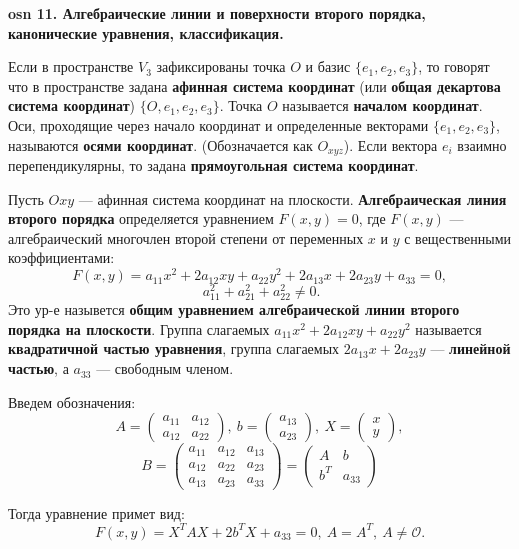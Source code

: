 \setcounter{section}{15}
\setcounter{subsection}{11}
\setcounter{equation}{0}
\textbf{\LARGE osn 11. Алгебраические линии и поверхности второго порядка, канонические уравнения,  классификация.}

Если в пространстве $V_3$ зафиксированы точка $O$ и базис $\{e_1, e_2, e_3\}$, то говорят что в пространстве задана \textbf{афинная система координат} (или \textbf{общая декартова система координат}) $\{O, e_1, e_2, e_3\}$. Точка $O$ называется \textbf{началом координат}. Оси, проходящие через начало координат и определенные векторами $\{e_1, e_2, e_3\}$, называются \textbf{осями координат}. (Обозначается как $O_{xyz}$). Если вектора $e_i$ взаимно перепендикулярны, то задана \textbf{прямоугольная система координат}.

\bigbreak

Пусть $Oxy$ --- афинная система координат на плоскости. \textbf{Алгебраическая линия второго порядка} определяется уравнением $F(x, y) = 0$, где $F(x, y)$ --- алгебраический многочлен второй степени от переменных $x$ и $y$ с вещественными коэффициентами:
$$F(x,y)=a_{11}x^2 +2a_{12}xy+a_{22}y^2 +2a_{13}x+2a_{23}y+a_{33} =0,$$
$$~a_{11}^2 + a_{21}^2 + a_{22}^2\neq 0.$$
Это ур-е назывется \textbf{общим уравнением алгебраической линии второго порядка на плоскости}. Группа слагаемых $a_{11}x^2 + 2a_{12}xy + a_{22}y^2$ называется \textbf{квадратичной частью уравнения}, группа слагаемых $2a_{13}x + 2a_{23}y$ --- \textbf{линейной частью}, а $a_{33}$ --- свободным членом.

Введем обозначения:
$$A = \begin{pmatrix} a_{11} & a_{12} \\a_{12} & a_{22}\end{pmatrix},~ b=\begin{pmatrix} a_{13} \\ a_{23} \end{pmatrix},~ X=\begin{pmatrix}x \\ y\end{pmatrix},$$
$$B = \begin{pmatrix} a_{11} & a_{12} & a_{13} \\a_{12} & a_{22} & a_{23} \\ a_{13} & a_{23} & a_{33}\end{pmatrix} = \begin{pmatrix} A & b \\ b^T & a_{33}\end{pmatrix}$$

Тогда уравнение примет вид:
$$F(x,y) = X^TAX+2b^TX+a_{33}=0,~A=A^T,~A\neq\mathcal{O}.$$

